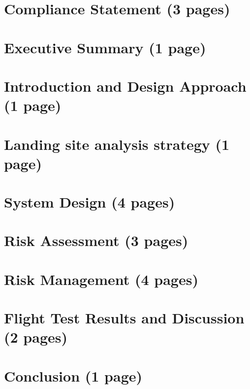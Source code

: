 \documentclass{article}
\begin{document}
\clearpage

\section{Compliance Statement (3 pages)}
\begin{figure}
	
\end{figure}


\clearpage
\section{Executive Summary (1 page)}


\clearpage
\section{Introduction and Design Approach (1 page)}


\clearpage
\section{Landing site analysis strategy (1 page)}


\clearpage
\section{System Design (4 pages)}


\clearpage
\section{Risk Assessment (3 pages)}


\clearpage
\section{Risk Management (4 pages)}


\clearpage
\section{Flight Test Results and Discussion (2 pages)}


\clearpage
\section{Conclusion (1 page)}

\end{document}
